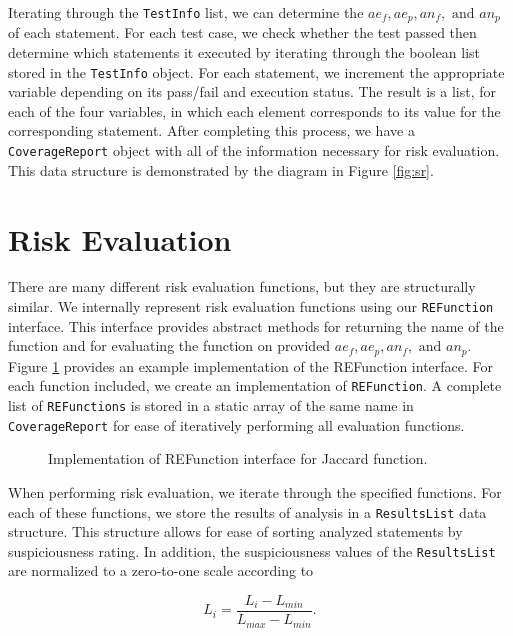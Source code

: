 Iterating through the \texttt{TestInfo} list, we can determine the $ae_f, ae_p, an_f, \text{ and } an_p$
of each statement.  For each test case, we check whether the test passed then determine which statements
it executed by iterating through the boolean list stored in the \texttt{TestInfo} object.  For each
statement, we increment the appropriate variable depending on its pass/fail and execution status.  The
result is a list, for each of the four variables, in which each element corresponds to its value for
the corresponding statement.  After completing this process, we have a \texttt{CoverageReport} object
with all of the information necessary for risk evaluation.  This data structure is demonstrated by the 
diagram in Figure \ref{fig:sr}.

\section{Risk Evaluation} \label{sec:re}

There are many different risk evaluation functions, but they are structurally similar.  We internally
represent risk evaluation functions using our \texttt{REFunction} interface.  This interface provides
abstract methods for returning the name of the function and for evaluating the function on provided
$ae_f, ae_p, an_f, \text{ and } an_p$.  Figure \ref{fig:re} provides an example implementation of
the REFunction interface.  For each function included, we create an implementation of
\texttt{REFunction}.  A complete list of \texttt{REFunctions} is stored in a static array of the
same name in \texttt{CoverageReport} for ease of iteratively performing all evaluation functions.  

\begin{figure}[tb]
\centering

\caption{Implementation of REFunction interface for Jaccard function.}
\label{fig:re}
\end{figure}

When performing risk evaluation, we iterate through the specified functions.  For each of these
functions, we store the results of analysis in a \texttt{ResultsList} data structure.  This
structure allows for ease of sorting analyzed statements by suspiciousness rating.  In addition, the
suspiciousness values of the \texttt{ResultsList} are normalized to a zero-to-one scale according to

\[ L_i = \frac{ L_i - L_{min} }{ L_{max} - L_{min} }. \]

